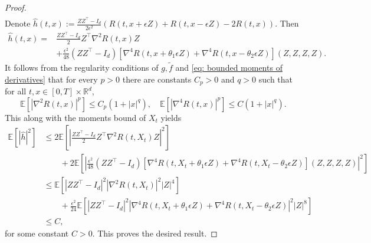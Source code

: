 \documentclass[twoside,11pt]{article}
\newcommand{\E}{\mathbb{E}}
\newcommand{\R}{\mathbb{R}}
\newcommand{\1}{\mathbf{1}}
\numberwithin{equation}{section}
\begin{document}
\begin{proof}
\begin{equation}
\begin{aligned}
         \end{aligned}
     \end{equation}
    Denote $ \hat h(t,x) := \frac{ZZ^{\top} - I_d}{2 \epsilon^2}\left( R(t,x+\epsilon Z) + R(t,x - \epsilon Z) - 2R(t,x)\right)$. Then
    \begin{equation}
        \begin{aligned}
            \hat h(t,x)  =& \frac{ZZ^{\top} - I_d}{2} Z^{\top}\nabla^2 R(t,x)Z \\
            &+ \frac{\epsilon^2}{48} (ZZ^{\top}- I_d)\left[ \nabla^4 R(t,x+\theta_1 \epsilon Z) + \nabla^4 R(t,x - \theta_2 \epsilon Z)\right](Z,Z,Z,Z).
        \end{aligned}
    \end{equation}
     It follows from the regularity conditions of $ g, \tilde f$ and \eqref{eq: bounded moments of derivatives} that for every $ p>0$ there are constants $ C_p>0 $ and  $ q>0$ such that for all $ t,x \in [0,T]\times \R^d$,
     \begin{equation}
         \E\left[ |\nabla^2R(t,x)|^p\right] \le C_p(1 + |x|^q),\quad \E\left[ |\nabla^4 R(t,x)|^p\right] \le C(1+|x|^q).
     \end{equation}
     This along with the moments bound of $ X_t$ yields
     \begin{equation}
     \begin{aligned}
         \E[ |\hat h|^2] &\le 2\E\left[ \left| \frac{ZZ^{\top} - I_d}{2} Z^{\top}\nabla^2 R(t,X_t)Z\right|^2\right]\\
         &\qquad+ 2\E\left[ \left| \frac{\epsilon^2}{48} (ZZ^{\top}- I_d)\left[ \nabla^4 R(t,X_t+\theta_1 \epsilon Z) + \nabla^4 R(t,X_t - \theta_2 \epsilon Z)\right](Z,Z,Z,Z)\right|^2\right]\\
         &\le \E\left[ \left| ZZ^{\top} - I_d\right|^2\left| \nabla^2 R(t,X_t)\right|^2 \left| Z\right|^4\right]\\
         &\qquad+ \frac{\epsilon^2}{24}\E\left[ \left| ZZ^{\top} - I_d\right|^2\left| \nabla^4 R(t,X_t+\theta_1 \epsilon Z) + \nabla^4 R(t,X_t - \theta_2 \epsilon Z)\right|^2\left| Z\right|^8\right]\\
         &\le C,
     \end{aligned}
     \end{equation}
     for some constant $ C>0$. This proves the desired result.
 \end{proof}
\end{document}
